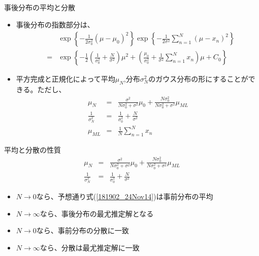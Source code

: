 \begin{frame}{事後分布の平均と分散}
 \begin{itemize}
  \item 事後分布の指数部分は、
        \begin{eqnarray}
         & &\exp\left\{-\frac{1}{2\sigma_0^2}(\mu-\mu_0)^2\right\} \exp\left\{-\frac{1}{2\sigma^2}\sum_{n=1}^{N}(\mu-x_n)^2\right\} \nonumber \\
         &= & \exp\left\{-\frac{1}{2}\left(\frac{1}{\sigma_0^2}+\frac{N}{\sigma^2}\right)\mu^2 +\left(\frac{\mu_0}{\sigma_0^2}+\frac{1}{\sigma^2}\sum_{n=1}^{N}x_n\right)\mu +C_0 \right\} \nonumber
        \end{eqnarray}
  \item 平方完成と正規化によって平均$\mu_N$,分布$\sigma_N^2$のガウス分布の形にすることができる。ただし、
        \begin{eqnarray}
         \mu_N& = & \frac{\sigma^2}{N\sigma_0^2+\sigma^2}\mu_0 + \frac{N\sigma_0^2}{N\sigma_0^2+\sigma^2}\mu_{ML}\label{223654_18Nov14}\\
         \frac{1}{\sigma_N^2}&= & \frac{1}{\sigma_0^2} + \frac{N}{\sigma^2}\label{181817_24Nov14}\\
         \mu_{ML}&= & \frac{1}{N}\sum_{n=1}^{N}x_n
        \end{eqnarray}
 \end{itemize}
\end{frame}

\begin{frame}{平均と分散の性質}
 \begin{eqnarray}
  \mu_N& = & \frac{\sigma^2}{N\sigma_0^2+\sigma^2}\mu_0 + \frac{N\sigma_0^2}{N\sigma_0^2+\sigma^2}\mu_{ML}\label{181902_24Nov14}\\
  \frac{1}{\sigma_N^2}&= & \frac{1}{\sigma_0^2} + \frac{N}{\sigma^2}
 \end{eqnarray}
 \begin{itemize}
  \item $N\rightarrow0$なら、予想通り式(\ref{181902_24Nov14})は事前分布の平均
  \item $N\rightarrow\infty$なら、事後分布の最尤推定解となる
  \item $N\rightarrow0$なら、事前分布の分散に一致
  \item $N\rightarrow\infty$なら、分散は最尤推定解に一致
 \end{itemize}
\end{frame}


